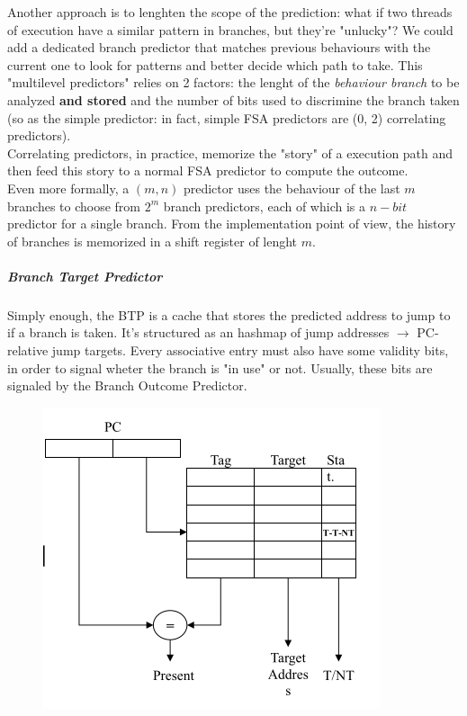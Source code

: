 \documentclass[10pt,a4paper]{article}
\begin{document}
							Another approach is to lenghten the scope of the prediction: what if two threads of execution have a similar pattern in branches, but they're "unlucky"? We could add a dedicated branch predictor that matches previous behaviours with the current one to look for patterns and better decide which path to take. This "multilevel predictors" relies on 2 factors: the lenght of the \emph{behaviour branch} to be analyzed \textbf{and stored} and the number of bits used to discrimine the branch taken (so as the simple predictor: in fact, simple FSA predictors are (0, 2) correlating predictors).\\
							Correlating predictors, in practice, memorize the "story" of a execution path and then feed this story to a normal FSA predictor to compute the outcome.\\
							Even more formally, a $(m, n)$ predictor uses the behaviour of the last $m$ branches to choose from $2^m$ branch predictors, each of which is a $n-bit$ predictor for a single branch. From the implementation point of view, the history of branches is memorized in a shift register of lenght $m$. 
						
						\subparagraph{Branch Target Predictor}
							Simply enough, the BTP is a cache that stores the predicted address to jump to if a branch is taken. It's structured as an hashmap of jump addresses $\rightarrow$ PC-relative jump targets. Every associative entry must also have some validity bits, in order to signal wheter the branch is "in use" or not. Usually, these bits are signaled by the Branch Outcome Predictor.
							\begin{figure}[H]
								\centering
								\includegraphics[width = \textwidth]{./images/BTP.png}
							\end{figure}
						
\end{document}
